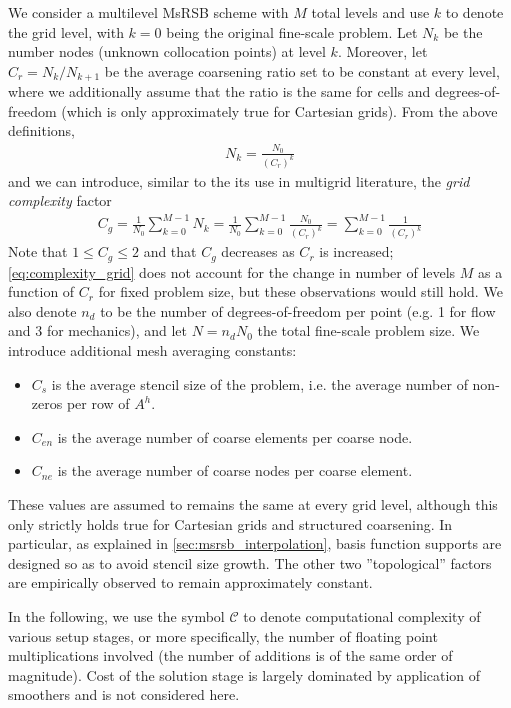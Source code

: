 We consider a multilevel MsRSB scheme with $M$ total levels and use $k$ to denote the grid level, with $k=0$ being the original fine-scale problem.   Let $N_k$ be the number nodes (unknown collocation points) at level $k$.   Moreover, let $C_r = N_k/N_{k+1}$ be the average coarsening ratio set to be constant at every level, where we additionally assume that the ratio is the same for cells and degrees-of-freedom (which is only approximately true for Cartesian grids).   From the above definitions,
\begin{align}
    N_k = \frac{N_0}{(C_r)^k}
\end{align}
and we can introduce, similar to the its use in multigrid literature, the \textit{grid complexity} factor
\begin{align}
    C_g = \frac{1}{N_0}\sum\limits_{k=0}^{M-1} N_k = \frac{1}{N_0}\sum\limits_{k=0}^{M-1}\frac{N_0}{(C_r)^k} = \sum\limits_{k=0}^{M-1}\frac{1}{(C_r)^k} \label{eq:complexity_grid}
\end{align}
Note that $1 \leq C_g \leq 2$ and that $C_g$ decreases as $C_r$ is increased; \cref{eq:complexity_grid} does not account for the change in number of levels $M$ as a function of $C_r$ for fixed problem size, but these observations would still hold.   We also denote $n_d$ to be the number of degrees-of-freedom per point (e.g. 1 for flow and 3 for mechanics), and let $N = n_d N_0$ the total fine-scale problem size.   We introduce additional mesh averaging constants:
\begin{itemize}
    \item $C_s$ is the average stencil size of the problem, i.e. the average number of non-zeros per row of $A^h$.
    \item $C_{en}$ is the average number of coarse elements per coarse node.
    \item $C_{ne}$ is the average number of coarse nodes per coarse element.
\end{itemize}
These values are assumed to remains the same at every grid level, although this only strictly holds true for Cartesian grids and structured coarsening.   In particular, as explained in \cref{sec:msrsb_interpolation}, basis function supports are designed so as to avoid stencil size growth.   The other two ''topological'' factors are empirically observed to remain approximately constant.

In the following, we use the symbol $\mathcal{C}$ to denote computational complexity of various setup stages, or more specifically, the number of floating point multiplications involved (the number of additions is of the same order of magnitude).   Cost of the solution stage is largely dominated by application of smoothers and is not considered here.

